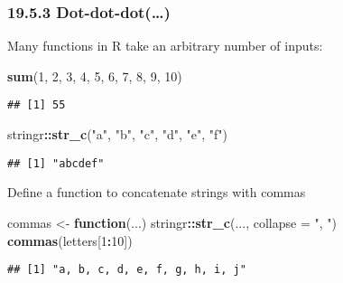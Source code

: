 \documentclass[
]{article}
\newenvironment{Shaded}{\begin{snugshade}}{\end{snugshade}}
\newcommand{\AttributeTok}[1]{\textcolor[rgb]{0.13,0.29,0.53}{#1}}
\newcommand{\ControlFlowTok}[1]{\textcolor[rgb]{0.13,0.29,0.53}{\textbf{#1}}}
\newcommand{\DecValTok}[1]{\textcolor[rgb]{0.00,0.00,0.81}{#1}}
\newcommand{\FunctionTok}[1]{\textcolor[rgb]{0.13,0.29,0.53}{\textbf{#1}}}
\newcommand{\NormalTok}[1]{#1}
\newcommand{\OtherTok}[1]{\textcolor[rgb]{0.56,0.35,0.01}{#1}}
\newcommand{\SpecialCharTok}[1]{\textcolor[rgb]{0.81,0.36,0.00}{\textbf{#1}}}
\newcommand{\StringTok}[1]{\textcolor[rgb]{0.31,0.60,0.02}{#1}}
\begin{document}
\hypertarget{dot-dot-dot}{%
\subsubsection{19.5.3 Dot-dot-dot(\ldots)}\label{dot-dot-dot}}

Many functions in R take an arbitrary number of inputs:

\begin{Shaded}
\begin{Highlighting}[]
\FunctionTok{sum}\NormalTok{(}\DecValTok{1}\NormalTok{, }\DecValTok{2}\NormalTok{, }\DecValTok{3}\NormalTok{, }\DecValTok{4}\NormalTok{, }\DecValTok{5}\NormalTok{, }\DecValTok{6}\NormalTok{, }\DecValTok{7}\NormalTok{, }\DecValTok{8}\NormalTok{, }\DecValTok{9}\NormalTok{, }\DecValTok{10}\NormalTok{)}
\end{Highlighting}
\end{Shaded}

\begin{verbatim}
## [1] 55
\end{verbatim}

\begin{Shaded}
\begin{Highlighting}[]
\NormalTok{stringr}\SpecialCharTok{::}\FunctionTok{str\_c}\NormalTok{(}\StringTok{"a"}\NormalTok{, }\StringTok{"b"}\NormalTok{, }\StringTok{"c"}\NormalTok{, }\StringTok{"d"}\NormalTok{, }\StringTok{"e"}\NormalTok{, }\StringTok{"f"}\NormalTok{)}
\end{Highlighting}
\end{Shaded}

\begin{verbatim}
## [1] "abcdef"
\end{verbatim}

Define a function to concatenate strings with commas

\begin{Shaded}
\begin{Highlighting}[]
\NormalTok{commas }\OtherTok{\textless{}{-}} \ControlFlowTok{function}\NormalTok{(...) stringr}\SpecialCharTok{::}\FunctionTok{str\_c}\NormalTok{(..., }\AttributeTok{collapse =} \StringTok{", "}\NormalTok{)}
\FunctionTok{commas}\NormalTok{(letters[}\DecValTok{1}\SpecialCharTok{:}\DecValTok{10}\NormalTok{])}
\end{Highlighting}
\end{Shaded}

\begin{verbatim}
## [1] "a, b, c, d, e, f, g, h, i, j"
\end{verbatim}
\end{document}
